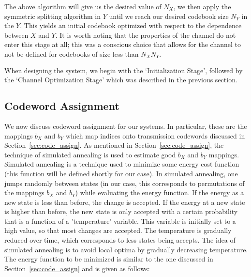 The above algorithm will give us the desired value of $N_X$, we then apply the symmetric splitting algorithm in $Y$ until we reach our desired codebook size $N_Y$ in the $Y$. This yields an initial codebook optimized with respect to the dependence between $X$ and $Y$. It is worth noting that the properties of the channel do not enter this stage at all; this was a conscious choice that allows for the channel to not be defined for codebooks of size less than $N_XN_Y$.

When designing the system, we begin with the `Initialization Stage', followed by the `Channel Optimization Stage' which was described in the previous section.

\subsection{Codeword Assignment}
We now discuss codeword assignment for our systems. In particular, these are the mappings $b_X$ and $b_Y$ which map indices onto transmission codewords discussed in Section~\ref{sec:code_assign}. As mentioned in Section~\ref{sec:code_assign}, the technique of simulated annealing is used to estimate good $b_X$ and $b_Y$ mappings. Simulated annealing is a technique used to minimize some energy cost function (this function will be defined shortly for our case). In simulated annealing, one jumps randomly between states (in our case, this corresponds to permutations of the mappings $b_X$ and $b_Y$) while evaluating the energy function. If the energy as a new state is less than before, the change is accepted. If the energy at a new state is higher than before, the new state is only accepted with a certain probability that is a function of a 'temperature' variable. This variable is initially set to a high value, so that most changes are accepted. The temperature is gradually reduced over time, which corresponds to less states being accepts. The idea of simulated annealing is to avoid local optima by gradually decreasing temperature. The energy function to be minimized is similar to the one discussed in Section~\ref{sec:code_assign} and is given as follows:

